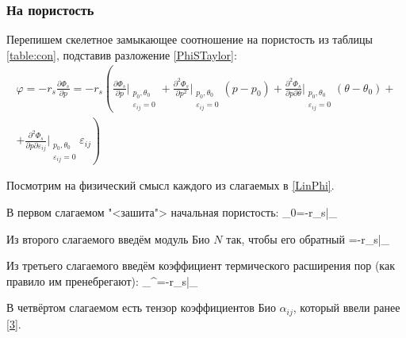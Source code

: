 \documentclass[main.tex]{subfiles}
\begin{document}
\begin{comment}
\begin{center}
	Ход чёрных
	\medskip
	
	\newgame
	\fenboard{r2qnrk1/p3p3/2p3p1/3pb2P/6p1/2N1B3/PPPQ4/2KR3R w - - 0 20}
	\showboard
\end{center}
\end{comment}

\subsubsection{На пористость}
Перепишем скелетное замыкающее соотношение на пористость из таблицы \ref{table:con}, подставив разложение \ref{PhiSTaylor}:
\begin{multline}\label{LinPhi}
\varphi=-r_s\frac{\partial\Phi_s}{\partial p}=-r_s\left(\frac{\partial\Phi_s}{\partial p}\bigg|_{\substack{p_0,\theta_0\\\varepsilon_{ij}=0}}+\frac{\partial^2\Phi_s}{\partial p^2}\bigg|_{\substack{p_0,\theta_0\\\varepsilon_{ij}=0}}\left(p-p_0\right)+\frac{\partial^2\Phi_s}{\partial p\partial\theta}\bigg|_{\substack{p_0,\theta_0\\\varepsilon_{ij}=0}}\left(\theta-\theta_0\right)+\right.\\+\left.\frac{\partial^2\Phi_s}{\partial p\partial\varepsilon_{ij}}\bigg|_{\substack{p_0,\theta_0\\\varepsilon_{ij}=0}}\varepsilon_{ij}\right)
\end{multline}

Посмотрим на физический смысл каждого из слагаемых в \eqref{LinPhi}.

В первом слагаемом "<зашита"> начальная пористость:
\beq
\varphi_0=-r_s\bigg|_{}
\eeq

Из второго слагаемого введём модуль Био $N$ так, чтобы его обратный
\beq\label{Bio}
=-r_s\bigg|_{}
\eeq

Из третьего слагаемого введём коэффициент термического расширения пор (как правило им пренебрегают):
\beq
\alpha_\theta^\varphi=-r_s\bigg|_{}
\eeq

В четвёртом слагаемом есть тензор коэффициентов Био $\alpha_{ij}$, который ввели ранее \eqref{3}.
\end{document}
